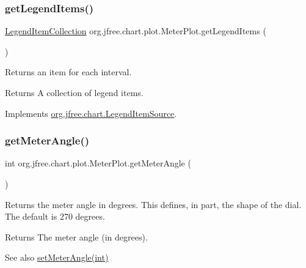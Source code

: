 \subsubsection{\texorpdfstring{get\+Legend\+Items()}{getLegendItems()}}
{\footnotesize\ttfamily \mbox{\hyperlink{classorg_1_1jfree_1_1chart_1_1_legend_item_collection}{Legend\+Item\+Collection}} org.\+jfree.\+chart.\+plot.\+Meter\+Plot.\+get\+Legend\+Items (\begin{DoxyParamCaption}{ }\end{DoxyParamCaption})}

Returns an item for each interval.

\begin{DoxyReturn}{Returns}
A collection of legend items. 
\end{DoxyReturn}


Implements \mbox{\hyperlink{interfaceorg_1_1jfree_1_1chart_1_1_legend_item_source_a224409463c4f7a8ef0e2a9df337e6d3b}{org.\+jfree.\+chart.\+Legend\+Item\+Source}}.

\mbox{\label{classorg_1_1jfree_1_1chart_1_1plot_1_1_meter_plot_a6b166a09f3cb56d314a7d0b6c6aa93db}} 
\subsubsection{\texorpdfstring{get\+Meter\+Angle()}{getMeterAngle()}}
{\footnotesize\ttfamily int org.\+jfree.\+chart.\+plot.\+Meter\+Plot.\+get\+Meter\+Angle (\begin{DoxyParamCaption}{ }\end{DoxyParamCaption})}

Returns the meter angle in degrees. This defines, in part, the shape of the dial. The default is 270 degrees.

\begin{DoxyReturn}{Returns}
The meter angle (in degrees).
\end{DoxyReturn}
\begin{DoxySeeAlso}{See also}
\mbox{\hyperlink{classorg_1_1jfree_1_1chart_1_1plot_1_1_meter_plot_aef7b760aa154ce1bf12b51bc4d693f91}{set\+Meter\+Angle(int)}} 
\end{DoxySeeAlso}
\mbox{\label{classorg_1_1jfree_1_1chart_1_1plot_1_1_meter_plot_af41ded0aa388151876aa97f63a39439b}} 
